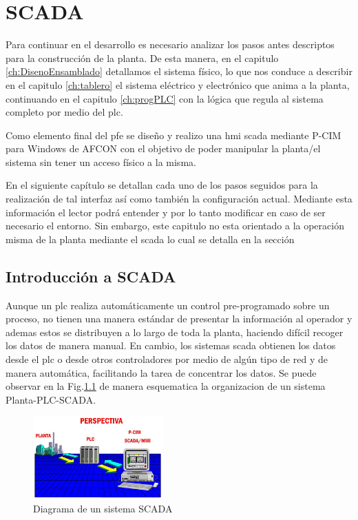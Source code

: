 \chapter{SCADA}
\label{ch:scada}

Para continuar en el desarrollo es necesario analizar los pasos antes descriptos para la construcción
de la planta. De esta manera, en el capitulo \ref{ch:DisenoEnsamblado} detallamos el sistema 
físico, lo que nos conduce a describir en el capitulo \ref{ch:tablero} el sistema eléctrico y
electrónico que anima a la planta, continuando en el capitulo \ref{ch:progPLC} con la lógica
que regula al sistema completo por medio del \gls{plc}. 

Como elemento final del \gls{pfe} se diseño y realizo una \gls{hmi} \gls{scada}
mediante P-CIM para Windows de AFCON con el objetivo de poder manipular la planta/el sistema
sin tener un acceso físico a la misma.

En el siguiente capítulo se detallan cada uno de los pasos seguidos para la realización de tal 
interfaz así como también la configuración actual. Mediante esta información el lector podrá entender
y por lo tanto modificar en caso de ser necesario el entorno. Sin embargo, este capitulo no esta 
orientado a la operación misma de la planta mediante el \gls{scada} lo cual se detalla en la sección

\section{Introducción a SCADA}
\label{sec:IntroScada}

Aunque un \gls{plc} realiza automáticamente un control pre-programado sobre un proceso, 
no tienen una manera estándar de presentar la información al operador y ademas estos se 
distribuyen a lo largo de toda la planta, haciendo difícil recoger los datos de manera 
manual.%
En cambio, los sistemas \gls{scada} obtienen los datos desde el \gls{plc} o desde otros controladores 
por medio de algún tipo de red y de manera automática, facilitando la tarea de concentrar los datos.
Se puede observar en la Fig.\ref{fig:perspectivaSCADA} de manera esquematica la organizacion 
de un sistema Planta-PLC-SCADA.
\begin{figure}[ht!]
	\centering
	\includegraphics[width=0.445\textwidth]
	{Cap5-SCADA/images/perspectiva.jpeg}
	\caption{Diagrama de un sistema SCADA}
	\label{fig:perspectivaSCADA}
\end{figure}

